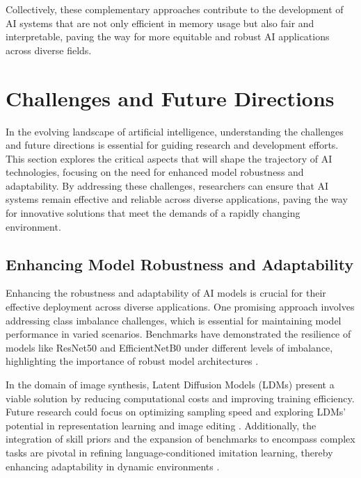 Collectively, these complementary approaches contribute to the development of AI systems that are not only efficient in memory usage but also fair and interpretable, paving the way for more equitable and robust AI applications across diverse fields.









\section{Challenges and Future Directions} \label{sec:Challenges and Future Directions}

In the evolving landscape of artificial intelligence, understanding the challenges and future directions is essential for guiding research and development efforts. This section explores the critical aspects that will shape the trajectory of AI technologies, focusing on the need for enhanced model robustness and adaptability. By addressing these challenges, researchers can ensure that AI systems remain effective and reliable across diverse applications, paving the way for innovative solutions that meet the demands of a rapidly changing environment.





\subsection{Enhancing Model Robustness and Adaptability} \label{subsec:Enhancing Model Robustness and Adaptability}



Enhancing the robustness and adaptability of AI models is crucial for their effective deployment across diverse applications. One promising approach involves addressing class imbalance challenges, which is essential for maintaining model performance in varied scenarios. Benchmarks have demonstrated the resilience of models like ResNet50 and EfficientNetB0 under different levels of imbalance, highlighting the importance of robust model architectures \cite{m2023comparativeanalysisimbalancedmalware}. 



In the domain of image synthesis, Latent Diffusion Models (LDMs) present a viable solution by reducing computational costs and improving training efficiency. Future research could focus on optimizing sampling speed and exploring LDMs' potential in representation learning and image editing . Additionally, the integration of skill priors and the expansion of benchmarks to encompass complex tasks are pivotal in refining language-conditioned imitation learning, thereby enhancing adaptability in dynamic environments \cite{zhou2024languageconditionedimitationlearningbase}.



